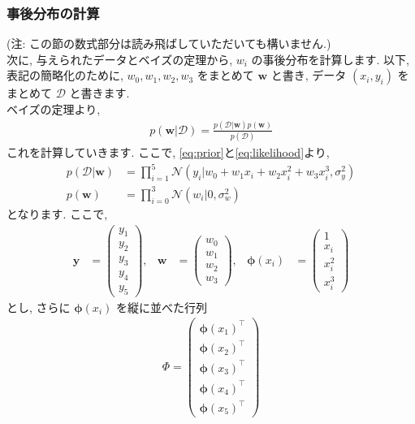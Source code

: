 \documentclass[b5paper,10pt]{jsarticle}
\begin{document}
\subsubsection{事後分布の計算}
(注: この節の数式部分は読み飛ばしていただいても構いません.) \\
次に, 与えられたデータとベイズの定理から, $w_i$ の事後分布を計算します. 以下, 表記の簡略化のために, $w_0, w_1, w_2, w_3$ をまとめて $\bm{w}$ と書き, データ $(x_i, y_i)$ をまとめて $\mathcal{D}$ と書きます. \\
ベイズの定理より, 
\begin{align}
    p(\bm{w} | \mathcal{D}) = \frac{p(\mathcal{D} | \bm{w}) p(\bm{w})}{p(\mathcal{D})}
\end{align}
これを計算していきます. ここで, \eqref{eq:prior}と\eqref{eq:likelihood}より, 
\begin{align}
    p(\mathcal{D} | \bm{w}) &= \prod_{i=1}^5 \mathcal{N}(y_i | w_0 + w_1 x_i + w_2 x_i^2 + w_3 x_i^3, \sigma_y^2) \\
    p(\bm{w}) &= \prod_{i=0}^3 \mathcal{N}(w_i | 0, \sigma_w^2)
\end{align}
となります. ここで,
\begin{align*}
    \bm{y} &=
    \begin{pmatrix}
        y_1 \\ y_2 \\ y_3 \\ y_4 \\ y_5
    \end{pmatrix}, &
    \bm{w} &=
    \begin{pmatrix}
        w_0 \\ w_1 \\ w_2 \\ w_3
    \end{pmatrix}, &
    \bm{\phi}(x_i) &=
    \begin{pmatrix}
        1 \\ x_i \\ x_i^2 \\ x_i^3
    \end{pmatrix}
\end{align*}
とし, さらに $\bm{\phi}(x_i)$ を縦に並べた行列
\begin{align*}
    \Phi =
    \begin{pmatrix}
        \bm{\phi}(x_1)^\top \\
        \bm{\phi}(x_2)^\top \\
        \bm{\phi}(x_3)^\top \\
        \bm{\phi}(x_4)^\top \\
        \bm{\phi}(x_5)^\top
    \end{pmatrix}
\end{align*}
\end{document}
